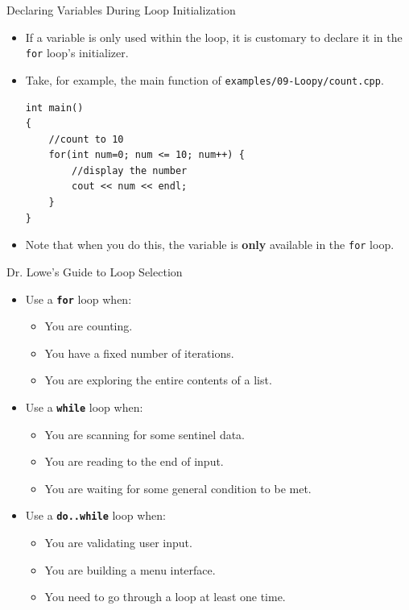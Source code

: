 \documentclass[]{beamer}
\begin{document}
\begin{frame}[fragile]{Declaring Variables During Loop Initialization}
    \begin{itemize}[<+->]
        \item If a variable is only used within the loop, it is
            customary to declare it in the \texttt{for} loop's
            initializer.
        \item Take, for example, the main function of
            \texttt{examples/09-Loopy/count.cpp}.
            \begin{verbatim}
int main()
{
    //count to 10
    for(int num=0; num <= 10; num++) {
        //display the number
        cout << num << endl;
    }
}
            \end{verbatim}
        \item Note that when you do this, the variable is
            \textbf{only} available in the \texttt{for} loop.
    \end{itemize}
\end{frame}

\begin{frame}{Dr. Lowe's Guide to Loop Selection}
    \begin{itemize}[<+->]
        \item Use a \texttt{\textbf{for}} loop when:
            \begin{itemize}
                \item You are counting.
                \item You have a fixed number of iterations.
                \item You are exploring the entire contents of a list.
            \end{itemize}
        \item Use a \texttt{\textbf{while}} loop when:
            \begin{itemize}
                \item You are scanning for some sentinel data.
                \item You are reading to the end of input.
                \item You are waiting for some general condition to be
                    met.
            \end{itemize}
        \item Use a \texttt{\textbf{do..while}} loop when:
            \begin{itemize}
                \item You are validating user input.
                \item You are building a menu interface.
                \item You need to go through a loop at least one time.
            \end{itemize}
    \end{itemize}
\end{frame}
\end{document}
